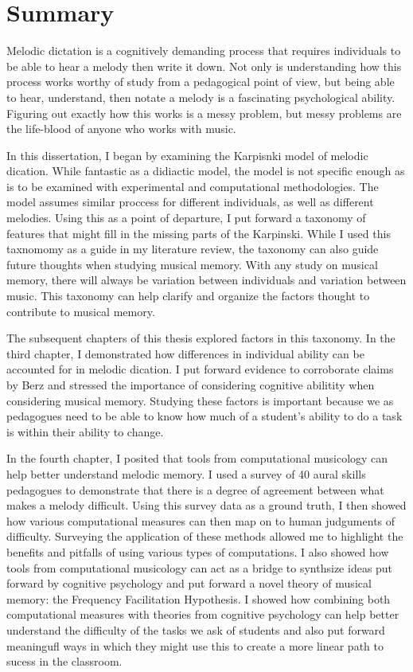 \documentclass[12pt,]{book}
\begin{document}
\hypertarget{summary}{%
\chapter{Summary}\label{summary}}

Melodic dictation is a cognitively demanding process that requires individuals to be able to hear a melody then write it down.
Not only is understanding how this process works worthy of study from a pedagogical point of view, but being able to hear, understand, then notate a melody is a fascinating psychological ability.
Figuring out exactly how this works is a messy problem, but messy problems are the life-blood of anyone who works with music.

In this dissertation, I began by examining the Karpisnki model of melodic dication.
While fantastic as a didiactic model, the model is not specific enough as is to be examined with experimental and computational methodologies.
The model assumes similar proccess for different individuals, as well as different melodies.
Using this as a point of departure, I put forward a taxonomy of features that might fill in the missing parts of the Karpinski.
While I used this taxnomomy as a guide in my literature review, the taxonomy can also guide future thoughts when studying musical memory.
With any study on musical memory, there will always be variation between individuals and variation between music.
This taxonomy can help clarify and organize the factors thought to contribute to musical memory.

The subsequent chapters of this thesis explored factors in this taxonomy.
In the third chapter, I demonstrated how differences in individual ability can be accounted for in melodic dication.
I put forward evidence to corroborate claims by Berz and stressed the importance of considering cognitive abilitity when considering musical memory.
Studying these factors is important because we as pedagogues need to be able to know how much of a student's ability to do a task is within their ability to change.

In the fourth chapter, I posited that tools from computational musicology can help better understand melodic memory.
I used a survey of 40 aural skills pedagogues to demonstrate that there is a degree of agreement between what makes a melody difficult.
Using this survey data as a ground truth, I then showed how various computational measures can then map on to human judguments of difficulty.
Surveying the application of these methods allowed me to highlight the benefits and pitfalls of using various types of computations.
I also showed how tools from computational musicology can act as a bridge to synthsize ideas put forward by cognitive psychology and put forward a novel theory of musical memory: the Frequency Facilitation Hypothesis.
I showed how combining both computational measures with theories from cognitive psychology can help better understand the difficulty of the tasks we ask of students and also put forward meaningufl ways in which they might use this to create a more linear path to sucess in the classroom.
\end{document}

